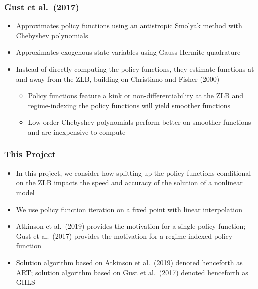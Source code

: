 \documentclass[11pt]{beamer}
\begin{document}
\begin{frame}\frametitle{Gust et al.\ (2017)}
\begin{itemize}\setlength{\itemsep}{6pt}
\item  <1-|handout:1>Approximates policy functions using an antistropic Smolyak method with Chebyshev polynomials
\item  <2-|handout:1>Approximates exogenous state variables using Gauss-Hermite quadrature%
\item  <3-|handout:1>Instead of directly computing the policy functions, they estimate functions at and away from the ZLB, building on Christiano and Fisher (2000)
  \begin{itemize}\setlength{\itemsep}{4pt}
\item  Policy functions feature a kink or non-differentiability at the ZLB and regime-indexing the policy functions will yield smoother functions
\item Low-order Chebyshev polynomials perform better on smoother functions and are inexpensive to compute
\end{itemize}
\end{itemize}
\end{frame}
\begin{frame}\frametitle{This Project}
\begin{itemize}\setlength{\itemsep}{8pt}
\item  <1-|handout:1>In this project, we consider how splitting up the policy functions conditional on the ZLB impacts the speed and accuracy of the solution of a nonlinear model
\item  <2-|handout:1>We use policy function iteration on a fixed point with linear interpolation
\item  <3-|handout:1>Atkinson et al.\ (2019) provides the motivation for a single policy function;  Gust et al.\ (2017) provides the motivation for a regime-indexed policy function
\item <4-|handout:1> Solution algorithm based on Atkinson et al.\ (2019) denoted henceforth as ART; solution algorithm based on Gust et al.\ (2017) denoted henceforth as GHLS
\end{itemize}
\end{frame}
\end{document}
